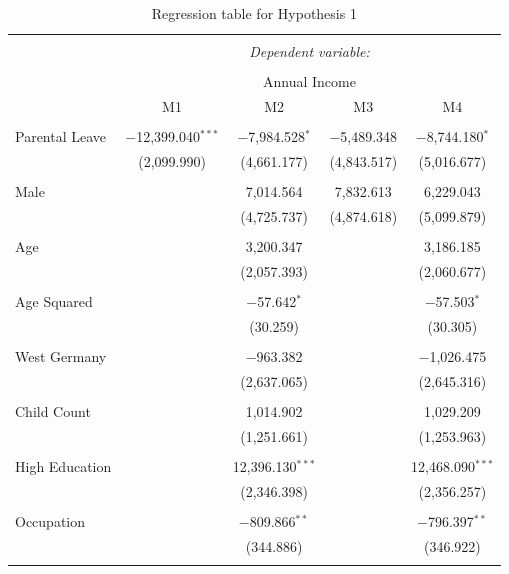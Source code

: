 \documentclass[
  12pt,
]{article}
\begin{document}
\begin{table}[!htbp] \centering 
  \caption{Regression table for Hypothesis 1} 
  \label{tab2} 
\footnotesize 
\begin{tabular}{@{\extracolsep{-5pt}}lcccc} 
\\[-1.8ex]\hline 
\hline \\[-1.8ex] 
 & \multicolumn{4}{c}{\textit{Dependent variable:}} \\ 
\cline{2-5} 
\\[-1.8ex] & \multicolumn{4}{c}{Annual Income} \\ 
 & M1 & M2 & M3 & M4 \\ 
\hline \\[-1.8ex] 
 Parental Leave & $-$12,399.040$^{***}$ & $-$7,984.528$^{*}$ & $-$5,489.348 & $-$8,744.180$^{*}$ \\ 
  & (2,099.990) & (4,661.177) & (4,843.517) & (5,016.677) \\ 
  & & & & \\ 
 Male &  & 7,014.564 & 7,832.613 & 6,229.043 \\ 
  &  & (4,725.737) & (4,874.618) & (5,099.879) \\ 
  & & & & \\ 
 Age &  & 3,200.347 &  & 3,186.185 \\ 
  &  & (2,057.393) &  & (2,060.677) \\ 
  & & & & \\ 
 Age Squared &  & $-$57.642$^{*}$ &  & $-$57.503$^{*}$ \\ 
  &  & (30.259) &  & (30.305) \\ 
  & & & & \\ 
 West Germany &  & $-$963.382 &  & $-$1,026.475 \\ 
  &  & (2,637.065) &  & (2,645.316) \\ 
  & & & & \\ 
 Child Count &  & 1,014.902 &  & 1,029.209 \\ 
  &  & (1,251.661) &  & (1,253.963) \\ 
  & & & & \\ 
 High Education &  & 12,396.130$^{***}$ &  & 12,468.090$^{***}$ \\ 
  &  & (2,346.398) &  & (2,356.257) \\ 
  & & & & \\ 
 Occupation &  & $-$809.866$^{**}$ &  & $-$796.397$^{**}$ \\ 
  &  & (344.886) &  & (346.922) \\ 
  & & & & \\ 

\end{tabular}
\end{table}
\end{document}

